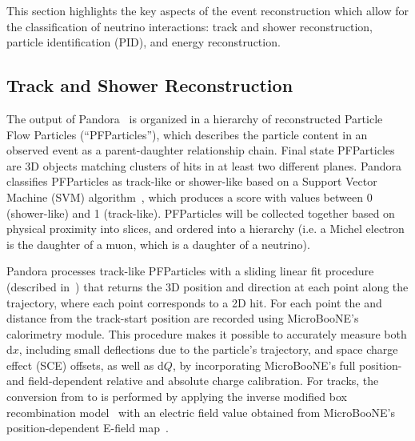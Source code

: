 This section highlights the key aspects of the event reconstruction which allow for the classification of neutrino interactions: track and shower reconstruction, particle identification (PID), and energy reconstruction.

\subsection{Track and Shower Reconstruction}
\label{sec:tkshreco}
The output of Pandora~\cite{bib:pandoraub} is organized in a hierarchy of reconstructed Particle Flow Particles (``PFParticles''), which describes the particle content in an observed event as a parent-daughter relationship chain. Final state PFParticles are 3D objects matching clusters of hits in at least two different planes.
Pandora classifies PFParticles as track-like or shower-like based on a Support Vector Machine (SVM) algorithm~\cite{bib:tkshsvm}, which produces a score with values between 0 (shower-like) and 1 (track-like). PFParticles will be collected together based on physical proximity into slices, and ordered into a hierarchy (i.e. a Michel electron is the daughter of a muon, which is a daughter of a neutrino).

Pandora processes track-like PFParticles with a sliding linear fit procedure (described in~\cite{bib:pandoraub}) that returns the 3D position and direction at each point along the trajectory, where each point corresponds to a 2D hit. 
For each point the \dqdx and distance from the track-start position are recorded using MicroBooNE's calorimetry module. 
This procedure makes it possible to accurately measure both d$x$, including small deflections due to the particle's trajectory, and space charge effect (SCE) offsets, as well as d$Q$, by incorporating MicroBooNE's full position- and field-dependent relative and absolute charge calibration. 
For tracks, the conversion from \dqdx to \dedx is performed by applying the inverse modified box recombination model~\cite{bib:tpccalibrationnote} with an electric field value obtained from MicroBooNE's position-dependent E-field map~\cite{bib:SCEdata}.


